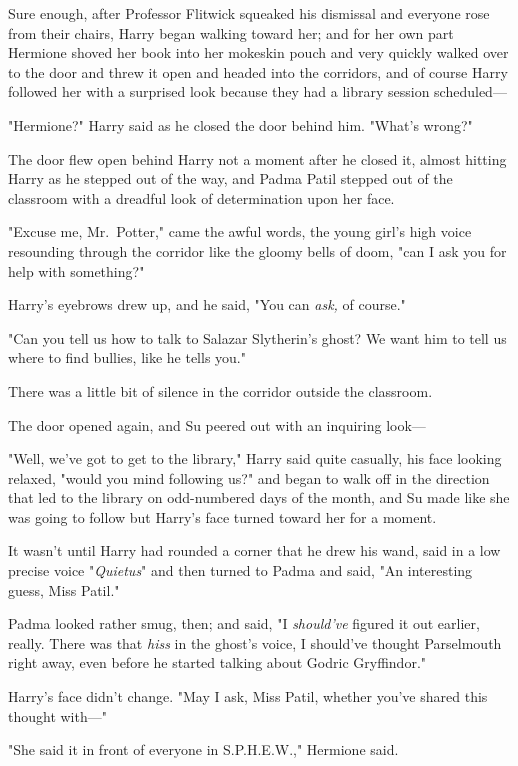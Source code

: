 Sure enough, after Professor Flitwick squeaked his dismissal and everyone rose 
from their chairs, Harry began walking toward her; and for her own part 
Hermione shoved her book into her mokeskin pouch and very quickly walked over 
to the door and threw it open and headed into the corridors, and of course 
Harry followed her with a surprised look because they had a library session 
scheduled---

"Hermione?" Harry said as he closed the door behind him. "What's wrong?"

The door flew open behind Harry not a moment after he closed it, almost hitting 
Harry as he stepped out of the way, and Padma Patil stepped out of the 
classroom with a dreadful look of determination upon her face.

"Excuse me, Mr.~Potter," came the awful words, the young girl's high voice 
resounding through the corridor like the gloomy bells of doom, "can I ask you 
for help with something?"

Harry's eyebrows drew up, and he said, "You can \emph{ask,} of course."

"Can you tell us how to talk to Salazar Slytherin's ghost? We want him to tell 
us where to find bullies, like he tells you."

There was a little bit of silence in the corridor outside the classroom.

The door opened again, and Su peered out with an inquiring look---

"Well, we've got to get to the library," Harry said quite casually, his face 
looking relaxed, "would you mind following us?" and began to walk off in the 
direction that led to the library on odd-numbered days of the month, and Su 
made like she was going to follow but Harry's face turned toward her for a 
moment.

It wasn't until Harry had rounded a corner that he drew his wand, said in a low 
precise voice "\emph{Quietus}" and then turned to Padma and said, "An 
interesting guess, Miss Patil."

Padma looked rather smug, then; and said, "I \emph{should've} figured it out 
earlier, really. There was that \emph{hiss} in the ghost's voice, I should've 
thought Parselmouth right away, even before he started talking about Godric 
Gryffindor."

Harry's face didn't change. "May I ask, Miss Patil, whether you've shared this 
thought with---"

"She said it in front of everyone in S.P.H.E.W.," Hermione said.

